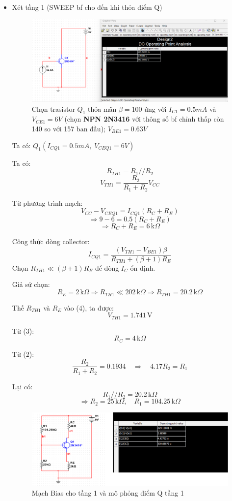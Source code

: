 \begin{itemize}[label=-]
	\item Xét tầng 1 (SWEEP bf cho đến khi thỏa điểm Q)

\begin{figure}[H]
	\centering
	\includegraphics[width=\linewidth]{./my-chapters/my-images/Question10/a_tang1.png}
	\caption{Chọn trasistor $Q_{1}$ thỏa mãn $\beta = 100$ ứng với $I_{C1}= 0.5 mA$ và $V_{CE1} = 6V$ (chọn \textbf{NPN 2N3416} với thông số bf chỉnh thấp còn 140 so với 157 ban đầu); $V_{BE1} = 0.63 V$}
\end{figure}

\noindent Ta có: $Q_1( I_{CQ1} = 0.5{mA},\; V_{CEQ1} = 6{V})$

Ta có:
\[
R_{TH1} = R_1 // R_2 \tag{1}
\]
\[
V_{TH1} = \frac{R_2}{R_1 + R_2} V_{CC} \tag{2}
\]

Từ phương trình mạch:
\[
V_{CC} - V_{CEQ1} = I_{CQ1}(R_C + R_E)
\]
\[
\Rightarrow 9 - 6 = 0.5(R_C + R_E)
\]
\[
\Rightarrow R_C + R_E = 6\,\text{k}\Omega \tag{3}
\]

Công thức dòng collector:
\[
I_{CQ1} = \frac{(V_{TH1} - V_{BE1})\beta}{R_{TH1} + (\beta + 1)R_E} \tag{4}
\]
Chọn \( R_{TH1} \ll (\beta + 1)R_E \) để dòng \( I_C \) ổn định.  

Giả sử chọn:
\[
R_E = 2\,\text{k}\Omega \Rightarrow R_{TH1} \ll 202\,\text{k}\Omega \Rightarrow R_{TH1} = 20.2\,\text{k}\Omega
\]

Thế \( R_{TH1} \) và \( R_E \) vào (4), ta được:
\[
V_{TH1} = 1.741\,\text{V}
\]

Từ (3):
\[
R_C = 4\,\text{k}\Omega
\]

Từ (2):
\[
\frac{R_2}{R_1 + R_2} = 0.1934 \quad \Rightarrow \quad 4.17R_2 = R_1
\]

Lại có:
\[
R_1 // R_2 = 20.2\,\text{k}\Omega
\]
\[
\Rightarrow R_2 = 25\,\text{k}\Omega,\quad R_1 = 104.25\,\text{k}\Omega
\]

\begin{figure}[H]
	\centering
	\includegraphics[width=.9\linewidth]{./my-chapters/my-images/Question10/a_tang2.png}
	\caption{Mạch Bias cho tầng 1 và mô phỏng điểm Q tầng 1}
\end{figure}


\end{itemize}
